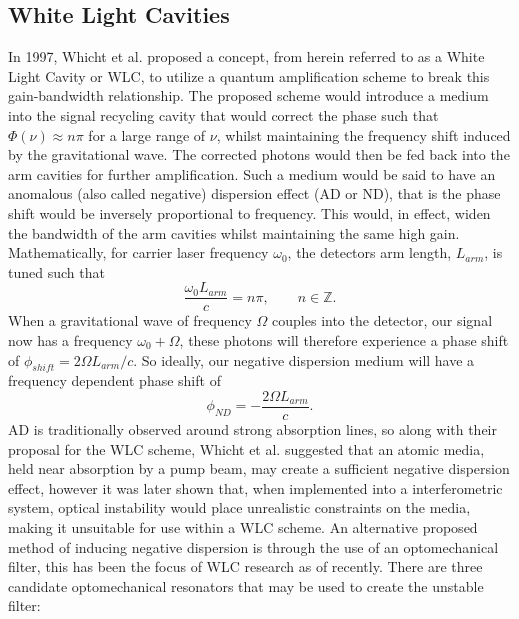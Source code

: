 \documentclass[aps,  
                a4paper, 
                amsmath, 
                amssymb, 
                preprint,
                tightenlines,  
                amsfonts,
                nofootinbib,
                onecolumn,
                titlepage,
                10pt
            ]{revtex4-2}
\begin{document}
    \subsection{White Light Cavities}
    In 1997, Whicht et al. proposed a concept, from herein referred to as a White Light Cavity or WLC, to utilize a quantum amplification scheme to break this gain-bandwidth relationship. The proposed scheme would introduce a medium into the signal recycling cavity that would correct the phase such that $\Phi(\nu)\approx n\pi$ for a large range of $\nu$, whilst maintaining the frequency shift induced by the gravitational wave. The corrected photons would then be fed back into the arm cavities for further amplification. Such a medium would be said to have an anomalous (also called negative) dispersion effect (AD or ND), that is the phase shift would be inversely proportional to frequency. This would, in effect, widen the bandwidth of the arm cavities whilst maintaining the same high gain. Mathematically, for carrier laser frequency $\omega_0$, the detectors arm length, $L_{arm}$, is tuned such that
    \begin{equation}
        \label{eq:cavity-resonance-condition}
        \frac{\omega_0L_{arm}}{c} = n\pi, \qquad n\in\mathbb{Z}.
    \end{equation}
    When a gravitational wave of frequency $\Omega$ couples into the detector, our signal now has a frequency $\omega_0+\Omega$, these photons will therefore experience a phase shift of $\phi_{shift}=2\Omega L_{arm}/c$. So ideally, our negative dispersion medium will have a frequency dependent phase shift of
    \begin{equation}
        \label{eq:phase-correction}
        \phi_{ND} = -\frac{2\Omega L_{arm}}{c}.
    \end{equation}
    AD is traditionally observed around strong absorption lines, so along with their proposal for the WLC scheme, Whicht et al. suggested that an atomic media, held near absorption by a pump beam, may create a sufficient negative dispersion effect, however it was later shown that, when implemented into a interferometric system, optical instability would place unrealistic constraints on the media, making it unsuitable for use within a WLC scheme. An alternative proposed method of inducing negative dispersion is through the use of an optomechanical filter, this has been the focus of WLC research as of recently. There are three candidate optomechanical resonators that may be used to create the unstable filter:
\end{document}
